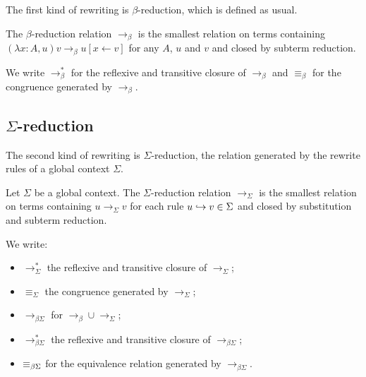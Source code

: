 The first kind of rewriting is $\beta$-reduction, which is defined as usual.

\begin{definition} The $\beta$-reduction relation $\longrightarrow_\beta$ is the smallest relation on terms containing
\( (\lambda x:A, u)v \longrightarrow_\beta u[x \leftarrow v] \) for any $A$, $u$ and $v$ and closed by subterm reduction.
\end{definition}

\begin{notation}
We write $\longrightarrow^*_\beta$ for the reflexive and transitive closure of $\longrightarrow_\beta$ and $\equiv_\beta$ for the congruence generated by $\longrightarrow_\beta$.
\end{notation}

\subsection{\texorpdfstring{$\Sigma$}{}-reduction}

The second kind of rewriting is $\Sigma$-reduction, the relation generated by the rewrite rules of a global context $\Sigma$.

\begin{definition}
Let $\Sigma$ be a global context. The  $\Sigma$-reduction relation $\longrightarrow_\Sigma$ is the smallest relation on terms containing $u \longrightarrow_\Sigma v$
for each rule $u \hookrightarrow v \in \Sigma$ and closed by substitution and subterm reduction.
\end{definition}

\begin{notation}
We write:

\begin{itemize}
\item $\longrightarrow^*_{\Sigma}$ the reflexive and transitive closure of $\longrightarrow_\Sigma$;
\item $\equiv_\Sigma$ the congruence generated by $\longrightarrow_{\Sigma}$;
\item $\longrightarrow_{\beta\Sigma}$ for $\longrightarrow_{\beta} \cup \longrightarrow_{\Sigma}$;
\item $\longrightarrow^*_{\beta\Sigma}$ the reflexive and transitive closure of $\longrightarrow_{\beta\Sigma}$;
\item $\equiv_{\beta\Sigma}$ for the equivalence relation generated by $\longrightarrow_{\beta\Sigma}$.
\end{itemize}
\end{notation}

